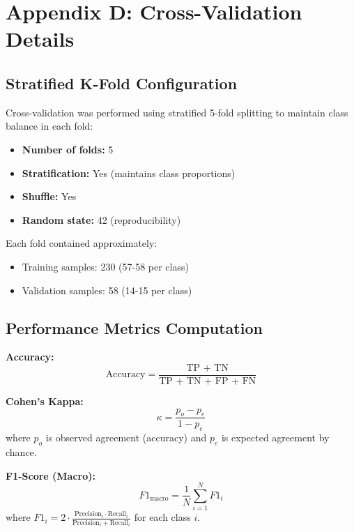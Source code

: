\documentclass[11pt]{article}
\begin{document}
\section{Appendix D: Cross-Validation Details}

\subsection{Stratified K-Fold Configuration}

Cross-validation was performed using stratified 5-fold splitting to maintain class balance in each fold:

\begin{itemize}
    \item \textbf{Number of folds:} 5
    \item \textbf{Stratification:} Yes (maintains class proportions)
    \item \textbf{Shuffle:} Yes
    \item \textbf{Random state:} 42 (reproducibility)
\end{itemize}

Each fold contained approximately:
\begin{itemize}
    \item Training samples: 230 (57-58 per class)
    \item Validation samples: 58 (14-15 per class)
\end{itemize}

\subsection{Performance Metrics Computation}

\textbf{Accuracy:}
\begin{equation}
\text{Accuracy} = \frac{\text{TP + TN}}{\text{TP + TN + FP + FN}}
\end{equation}

\textbf{Cohen's Kappa:}
\begin{equation}
\kappa = \frac{p_o - p_e}{1 - p_e}
\end{equation}
where $p_o$ is observed agreement (accuracy) and $p_e$ is expected agreement by chance.

\textbf{F1-Score (Macro):}
\begin{equation}
F1_{\text{macro}} = \frac{1}{N} \sum_{i=1}^{N} F1_i
\end{equation}
where $F1_i = 2 \cdot \frac{\text{Precision}_i \cdot \text{Recall}_i}{\text{Precision}_i + \text{Recall}_i}$ for each class $i$.
\end{document}
